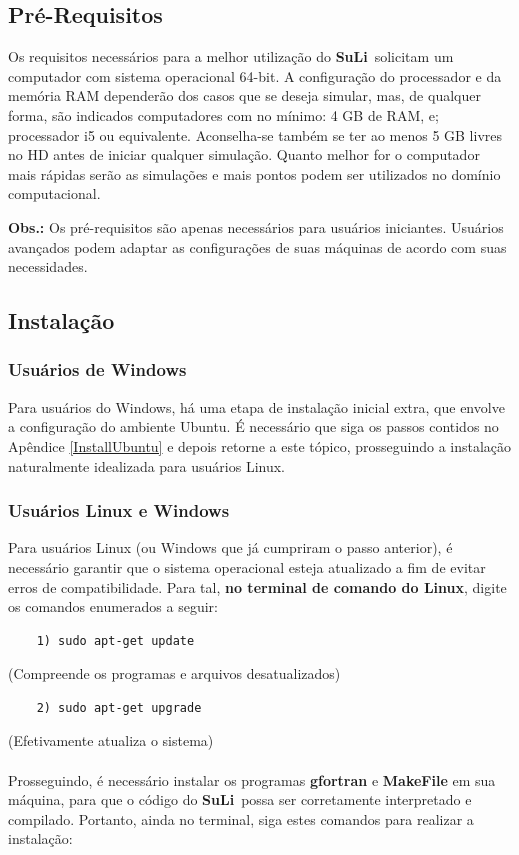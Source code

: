 \documentclass[12pt, a4paper]{article}
\newcommand{\SL}{{\bf SuLi}}
\begin{document}
\subsection{Pré-Requisitos}
Os requisitos necessários para a melhor utilização do \SL\ solicitam um computador com sistema operacional 64-bit. A configuração do processador e da memória RAM dependerão dos casos que se deseja simular, mas, de qualquer forma, são indicados computadores com no mínimo: 4 GB de RAM, e; processador i5 ou equivalente. Aconselha-se também se ter ao menos 5 GB livres no HD antes de iniciar qualquer simulação. Quanto melhor for o computador mais rápidas serão as simulações e mais pontos podem ser utilizados no domínio computacional. 

\textbf{Obs.:} Os pré-requisitos são apenas necessários para usuários iniciantes. Usuários avançados podem adaptar as configurações de suas máquinas de acordo com suas necessidades.

\subsection{Instalação}
\subsubsection{Usuários de Windows}	\label{WindowsUsers}
Para usuários do Windows, há uma etapa de instalação inicial extra, que envolve a configuração do ambiente Ubuntu. É necessário que siga os passos contidos no Apêndice \ref{InstallUbuntu} e depois retorne a este tópico, prosseguindo a instalação naturalmente idealizada para usuários Linux.

\subsubsection{Usuários Linux e Windows}  \label{ContinueInstall}
Para usuários Linux (ou Windows que já cumpriram o passo anterior), é necessário garantir que o sistema operacional esteja atualizado a fim de evitar erros de compatibilidade. Para tal, \textbf{no terminal de comando do Linux}, digite os comandos enumerados a seguir:

\begin{verbatim}
	1) sudo apt-get update
\end{verbatim}
(Compreende os programas e arquivos desatualizados)

\begin{verbatim}
	2) sudo apt-get upgrade
\end{verbatim}
(Efetivamente atualiza o sistema)
\\\\
Prosseguindo, é necessário instalar os programas {\bf gfortran} e {\bf MakeFile} em sua máquina, para que o código do \SL\ possa ser corretamente interpretado e compilado. Portanto, ainda no terminal, siga estes comandos para realizar a instalação:
\end{document}
